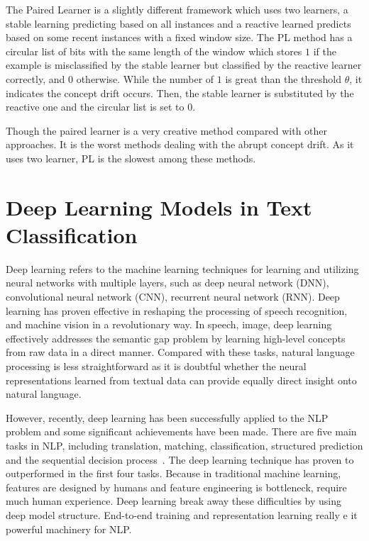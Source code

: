 The Paired Learner is a slightly different framework which uses two learners, a stable learning predicting based on all instances and a reactive learned predicts based on some recent instances with a fixed window size. The PL method has a circular list of bits with the same length of the window which stores $1$ if the example is misclassified by the stable learner but classified by the reactive learner correctly, and $0$ otherwise.
While the number of $1$ is great than the threshold $\theta$, it indicates the concept drift occurs. Then, the stable learner is substituted by the reactive one and the circular list is set to $0$. 

Though the paired learner is a very creative method compared with other approaches. It is the worst methods dealing with the abrupt concept drift. As it uses two learner, PL is the slowest among these methods.

\section{Deep Learning Models in Text Classification}
\label{dl}

Deep learning refers to the machine learning techniques for learning and utilizing neural networks with multiple layers, such as deep neural network (DNN), convolutional neural network (CNN), recurrent neural network (RNN). Deep learning has proven effective in reshaping the processing of speech recognition, and machine vision in a revolutionary way. In speech, image, deep learning effectively addresses the semantic gap problem by learning high-level concepts from raw data in a direct manner. Compared with these tasks, natural language processing is less straightforward as it is doubtful whether the neural representations learned from textual data can provide equally direct insight onto natural language. 

However, recently, deep learning has been successfully applied to the NLP problem and some significant achievements have been made. There are five main tasks in NLP, including translation, matching, classification, structured prediction and the sequential decision process~\cite{Li2017}. The deep learning technique has proven to outperformed in the first four tasks. Because in traditional machine learning, features are designed by humans and feature engineering is bottleneck, require much human experience. Deep learning break away these difficulties by using deep model structure. End-to-end training and representation learning really e it powerful machinery for NLP.

